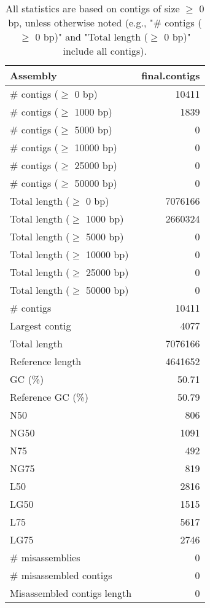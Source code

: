 \documentclass[12pt,a4paper]{article}
\begin{document}
\begin{table}[ht]
\begin{center}
\caption{All statistics are based on contigs of size $\geq$ 0 bp, unless otherwise noted (e.g., "\# contigs ($\geq$ 0 bp)" and "Total length ($\geq$ 0 bp)" include all contigs).}
\begin{tabular}{|l*{1}{|r}|}
\hline
Assembly & final.contigs \\ \hline
\# contigs ($\geq$ 0 bp) & 10411 \\ \hline
\# contigs ($\geq$ 1000 bp) & 1839 \\ \hline
\# contigs ($\geq$ 5000 bp) & 0 \\ \hline
\# contigs ($\geq$ 10000 bp) & 0 \\ \hline
\# contigs ($\geq$ 25000 bp) & 0 \\ \hline
\# contigs ($\geq$ 50000 bp) & 0 \\ \hline
Total length ($\geq$ 0 bp) & 7076166 \\ \hline
Total length ($\geq$ 1000 bp) & 2660324 \\ \hline
Total length ($\geq$ 5000 bp) & 0 \\ \hline
Total length ($\geq$ 10000 bp) & 0 \\ \hline
Total length ($\geq$ 25000 bp) & 0 \\ \hline
Total length ($\geq$ 50000 bp) & 0 \\ \hline
\# contigs & 10411 \\ \hline
Largest contig & 4077 \\ \hline
Total length & 7076166 \\ \hline
Reference length & 4641652 \\ \hline
GC (\%) & 50.71 \\ \hline
Reference GC (\%) & 50.79 \\ \hline
N50 & 806 \\ \hline
NG50 & 1091 \\ \hline
N75 & 492 \\ \hline
NG75 & 819 \\ \hline
L50 & 2816 \\ \hline
LG50 & 1515 \\ \hline
L75 & 5617 \\ \hline
LG75 & 2746 \\ \hline
\# misassemblies & 0 \\ \hline
\# misassembled contigs & 0 \\ \hline
Misassembled contigs length & 0 \\ \hline

\end{tabular}
\end{center}
\end{table}
\end{document}
